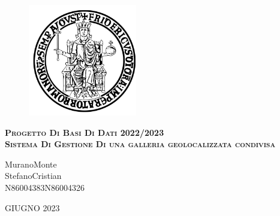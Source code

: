 \documentclass{report}
\begin{document}
    \begin{figure}[htbp!]
        \begin{center}
            \includegraphics[width=.25\textwidth]{immagini/FedericoII.png}
        \end{center}
    \end{figure}
\begin{center}
    {\scshape\Large\bfseries\center  Progetto Di Basi Di Dati 2022/2023 \\ Sistema Di Gestione Di una galleria geolocalizzata condivisa}
\end{center}
\vfill
    \begin{center}
	Murano\tab								    Monte	\\
	Stefano\tab									Cristian	\\
	N86004383\tab								N86004326 \\
		\begin{center}
			  GIUGNO 2023
		\end{center}			
    \end{center}
    \newpage
    
    \tableofcontents
    
    
    
    
    
\end{document}
